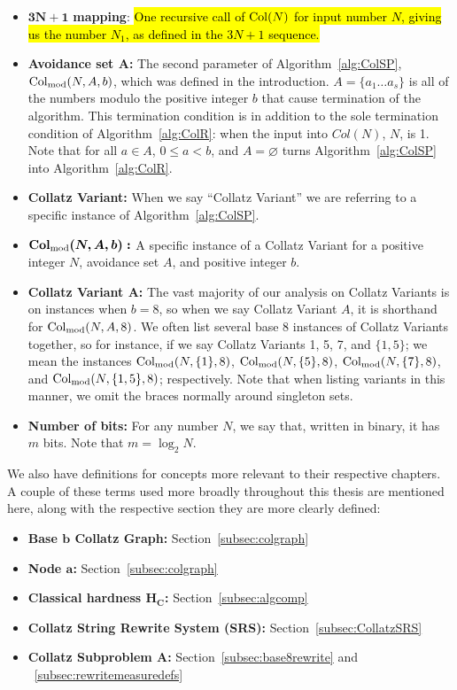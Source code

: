 \begin{itemize}
    \item $\boldsymbol{3N+1}$\textbf{ mapping}: \hl{One recursive call of $\mathrm{Col}(N)$ for input number $N$, giving us the number $N_1$, as defined in the $3N+1$ sequence.}
    \item \textbf{Avoidance set $\boldsymbol A$:} The second parameter of Algorithm~\ref{alg:ColSP}, $\mathrm{Col}_{\text{mod}}(N,A,b)$, which was defined in the introduction. $A = \{a_1 \ldots a_s\}$ is all of the numbers modulo the positive integer $b$ that cause termination of the algorithm. This termination condition is in addition to the sole termination condition of Algorithm~\ref{alg:ColR}: when the input into $Col(N)$, $N$, is 1. Note that for all $a \in A$, $0 \le a < b$, and $A = \varnothing$ turns Algorithm~\ref{alg:ColSP} into Algorithm~\ref{alg:ColR}.
    \item \textbf{Collatz Variant:} When we say ``Collatz Variant'' we are referring to a specific instance of Algorithm~\ref{alg:ColSP}.
    \item $\boldsymbol{\mathrm{Col}_{\text{mod}}(N,A,b):}$ A specific instance of a Collatz Variant for a positive integer $N$, avoidance set $A$, and positive integer $b$. 
    \item \textbf{Collatz Variant A:} The vast majority of our analysis on Collatz Variants is on instances when $b = 8$, so when we say Collatz Variant $A$, it is shorthand for $\mathrm{Col}_{\text{mod}}(N,A,8)$. We often list several base 8 instances of Collatz Variants together, so for instance, if we say Collatz Variants 1, 5, 7, and $\{1,5\}$; we mean the instances $\mathrm{Col}_{\text{mod}}(N,\{1\},8)$, $\mathrm{Col}_{\text{mod}}(N,\{5\},8)$, $\mathrm{Col}_{\text{mod}}(N,\{7\},8)$, and $\mathrm{Col}_{\text{mod}}(N,\{1,5\},8)$; respectively. Note that when listing variants in this manner, we omit the braces normally around singleton sets.
\item \textbf{Number of bits:} For any number $N$, we say that, written in binary, it has $m$ bits. Note that $m = \log_2{N}$.
\end{itemize}
We also have definitions for concepts more relevant to their respective chapters. A couple of these terms used more broadly throughout this thesis are mentioned here, along with the respective section they are more clearly defined:
\begin{itemize}
\item \textbf{Base $\boldsymbol b$ Collatz Graph:} Section~\ref{subsec:colgraph}
\item \textbf{Node $\boldsymbol a$:} Section~\ref{subsec:colgraph}
\item \textbf{Classical hardness $\boldsymbol {H_C}$:} Section~\ref{subsec:algcomp}
\item \textbf{Collatz String Rewrite System (SRS):} Section~\ref{subsec:CollatzSRS}
\item \textbf{Collatz Subproblem $\boldsymbol A$:} Section~\ref{subsec:base8rewrite} and ~\ref{subsec:rewritemeasuredefs} 
\end{itemize}
%
